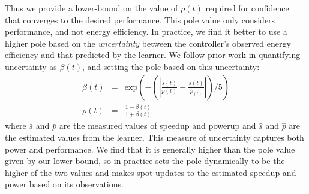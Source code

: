 Thus we provide a lower-bound on the value of $\rho(t)$ required for
confidence that \SYSTEM{} converges to the desired performance.  This
pole value only considers performance, and not energy efficiency.  In
practice, we find it better to use a higher pole based on the
\emph{uncertainty} between the controller's observed energy efficiency
and that predicted by the learner.  We follow prior work
\cite{Tokic2010} in quantifying uncertainty as $\beta(t)$, and setting
the pole based on this uncertainty:
\begin{equation}
  \begin{array}{rcl}
    \beta(t) &=&  \text{exp}{\left(- \left( \left|   \frac{\bar{s}(t)}{\bar{p}(t)}  -\frac{ \hat{s}(t)}{\hat{p}_(t)} \right| \right) /5\right)} \\
    \rho(t) &=& \frac{1-\beta(t)}{1+\beta(t)} 
  \end{array}
  \label{eqn:uncer}
\end{equation}
where $\bar{s}$ and $\bar{p}$ are the measured values of speedup and
powerup and $\hat{s}$ and $\hat{p}$ are the estimated values from the
learner.  This measure of uncertainty captures both power and
performance.  We find that it is generally higher than the pole value
given by our lower bound, so in practice \SYSTEM{} sets the pole
dynamically to be the higher of the two values and \SYSTEM{} makes
spot updates to the estimated speedup and power based on its
observations.
